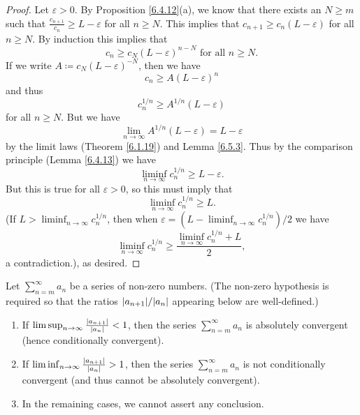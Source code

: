 \begin{proof}
    Let \(\varepsilon > 0\).
    By Proposition \ref{6.4.12}(a), we know that there exists an \(N \geq m\) such that \(\frac{c_{n + 1}}{c_n} \geq L - \varepsilon\) for all \(n \geq N\).
    This implies that \(c_{n + 1} \geq c_n (L - \varepsilon)\) for all \(n \geq N\).
    By induction this implies that
    \[
        c_n \geq c_N (L - \varepsilon)^{n - N} \text{ for all } n \geq N.
    \]
    If we write \(A \coloneqq c_N (L - \varepsilon)^{-N}\), then we have
    \[
        c_n \geq A(L - \varepsilon)^n
    \]
    and thus
    \[
        c_n^{1 / n} \geq A^{1 / n} (L - \varepsilon)
    \]
    for all \(n \geq N\).
    But we have
    \[
        \lim_{n \to \infty} A^{1 / n} (L - \varepsilon) = L - \varepsilon
    \]
    by the limit laws (Theorem \ref{6.1.19}) and Lemma \ref{6.5.3}.
    Thus by the comparison principle (Lemma \ref{6.4.13}) we have
    \[
        \liminf_{n \to \infty} c_n^{1 / n} \geq L - \varepsilon.
    \]
    But this is true for all \(\varepsilon > 0\), so this must imply that
    \[
        \liminf_{n \to \infty} c_n^{1 / n} \geq L.
    \]
    (If \(L > \liminf_{n \to \infty} c_n^{1 / n}\), then when \(\varepsilon = (L - \liminf_{n \to \infty} c_n^{1 / n}) / 2\) we have
    \[
        \liminf_{n \to \infty} c_n^{1 / n} \geq \frac{\liminf_{n \to \infty} c_n^{1 / n} + L}{2},
    \]
    a contradiction.), as desired.
\end{proof}

\begin{corollary}\label{7.5.3}
    Let \(\sum_{n = m}^\infty a_n\) be a series of non-zero numbers.
    (The non-zero hypothesis is required so that the ratios \(\abs*{a_{n + 1}} / \abs*{a_n}\) appearing below are well-defined.)
    \begin{enumerate}
        \item If \(\limsup_{n \to \infty} \frac{\abs*{a_{n + 1}}}{\abs*{a_n}} < 1\), then the series \(\sum_{n = m}^\infty a_n\) is absolutely convergent (hence conditionally convergent).
        \item If \(\liminf_{n \to \infty} \frac{\abs*{a_{n + 1}}}{\abs*{a_n}} > 1\), then the series \(\sum_{n = m}^\infty a_n\) is not conditionally convergent (and thus cannot be absolutely convergent).
        \item In the remaining cases, we cannot assert any conclusion.
    \end{enumerate}
\end{corollary}

